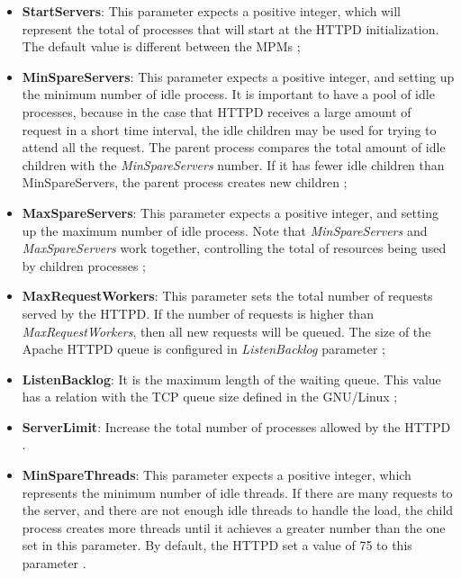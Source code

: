 \begin{itemize}
  \item \textbf{StartServers}: This parameter expects a positive integer, which
        will represent the total of processes that will start at the HTTPD
        initialization. The default value is different between the MPMs
        \cite{mpm_start_server};
  \item \textbf{MinSpareServers}: This parameter expects a positive integer,
        and setting up the minimum number of idle process. It is important to
        have a pool of idle processes, because in the case that HTTPD receives
        a large amount of request in a short time interval, the idle children
        may be used for trying to attend all the request. The parent process
        compares the total amount of idle children with the
        \textit{MinSpareServers} number. If it has fewer idle children than
        MinSpareServers, the parent process creates new
        children \cite{mpm_min_spare};
  \item \textbf{MaxSpareServers}: This parameter expects a positive integer,
        and setting up the maximum number of idle process. Note that
        \textit{MinSpareServers} and \textit{MaxSpareServers} work together,
        controlling the total of resources being used by children
        processes \cite{mpm_max_spare};
  \item \textbf{MaxRequestWorkers}: This parameter sets the total number of
        requests served by the HTTPD. If the number of requests is higher than
        \textit{MaxRequestWorkers}, then all new requests will be queued. The
        size of the Apache HTTPD queue is configured in \textit{ListenBacklog}
        parameter \cite{mpm_max_request};
  \item \textbf{ListenBacklog}: It is the maximum length of the waiting queue.
        This value has a relation with the TCP queue size defined in the
        GNU/Linux \cite{mpm_listen};
  \item \textbf{ServerLimit}: Increase the total number of processes allowed
        by the HTTPD \cite{mpm_server_limit}.
  \item \textbf{MinSpareThreads}: This parameter expects a positive integer,
        which represents the minimum number of idle threads. If there are many
        requests to the server, and there are not enough idle threads to handle
        the load, the child process creates more threads until it achieves a
        greater number than the one set in this parameter. By default, the
        HTTPD set a value of 75 to this parameter \cite{mpm_minsparethreads}.

\end{itemize}
